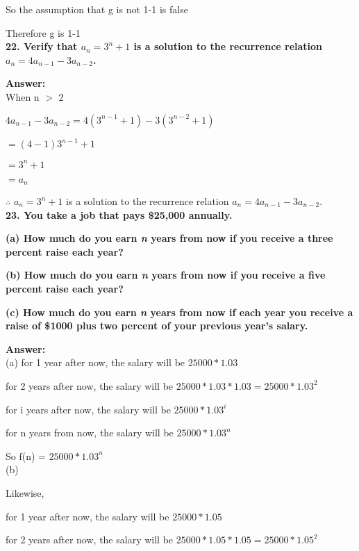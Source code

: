 \documentclass{article}
\begin{document}
\begin{large}
So the assumption that g is not 1-1 is false

Therefore g is 1-1\\


\textbf{22. Verify that $a_{n}={3^{n}+1}$ is a solution to the recurrence relation $a_{n}=4a_{n-1}-3a_{n-2}$.}

\textbf{Answer:} \\

When n $>$ 2

$4a_{n-1}-3a_{n-2} = 4 (3^{n-1} + 1) - 3 (3^{n-2} + 1)$

                    $= (4 - 1) 3^{n-1} + 1$
                    
                    $= 3^{n} + 1$
                    
                    $= a_{n}$

$\therefore$ $a_{n}={3^{n}+1}$ is a solution to the recurrence relation $a_{n}=4a_{n-1}-3a_{n-2}$.\\


\textbf{23. You take a job that pays \$25,000 annually.}

\textbf{(a) How much do you earn \emph{n} years from now if you receive a three percent raise each year?}

\textbf{(b) How much do you earn \emph{n} years from now if you receive a five percent raise each year? }

\textbf{(c) How much do you earn \emph{n} years from now if each year you receive a raise of \$1000 plus two percent of your previous year's salary.}

\textbf{Answer:} \\

(a) for 1 year after now, the salary will be $25000 * 1.03$

\indent\indent     for 2 years after now, the salary will be $25000 * 1.03 * 1.03 = 25000 * 1.03^2$

\indent\indent     for i years after now, the salary will be $25000 * 1.03^i$

\indent\indent     for n years from now, the salary will be $25000 * 1.03^n$

\indent So f(n) = $25000 * 1.03^n$\\

(b) 

Likewise, 

\indent\indent    for 1 year after now, the salary will be $25000 * 1.05$

\indent\indent    for 2 years after now, the salary will be $25000 * 1.05 * 1.05 = 25000 * 1.05^2$


\end{large}
\end{document}
